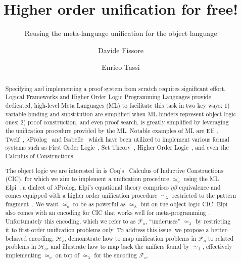 \documentclass[sigconf,natbib=false,review]{acmart}
\newcommand{\UnifRel}{\ensuremath{\simeq}}
\newcommand{\Uo}{\ensuremath{\UnifRel_o}\xspace}
\newcommand{\Ue}{\ensuremath{\UnifRel_\lambda}\xspace}
\newcommand{\Fo}{\ensuremath{\mathcal{F}_{\!o}\xspace}} %
\newcommand{\Ho}{\ensuremath{\mathcal{H}_o}\xspace}
\begin{document}
\title{Higher order unification for free!}
\subtitle{Reusing the meta-language unification for the object language}

\author{Davide Fissore}

\author{Enrico Tassi}

\begin{abstract}
  Specifying and implementing a proof system from scratch requires significant effort.
  Logical Frameworks and Higher Order Logic Programming Languages provide
  dedicated, high-level Meta Languages (ML) to facilitate this task in two
  key ways: 1) variable binding and substitution are simplified when ML binders
  represent object logic ones; 2) proof construction, and even proof search, is
  greatly simplified by leveraging the unification procedure provided by the ML.
  Notable examples of ML are Elf~\cite{elf}, Twelf~\cite{twelf},
  $\lambda$Prolog~\cite{miller_nadathur_2012} and
  Isabelle~\cite{10.1007/978-3-540-71067-7_7}
  which have been utilized to implement various formal systems such as
  First Order Logic~\cite{felty88cade},
  Set Theory~\cite{10.1007/BF00881873},
  Higher Order Logic~\cite{books/sp/NipkowPW02}, and even the Calculus of
  Constructions~\cite{felty93lics}.

  The object logic we are interested in is Coq's~\cite{Coq-refman}
  Calculus of Inductive Constructions (CIC),
  for which we aim to implement a unification procedure \Uo using the ML
  Elpi~\cite{dunchev15lpar}, a dialect of $\lambda$Prolog.
  Elpi's equational theory comprises
  $\eta\beta$ equivalence and comes equipped with a
  higher order unification procedure \Ue restricted to the pattern
  fragment~\cite{miller92jsc}.
  We want \Uo to be as powerful as \Ue but on the object logic CIC.
  Elpi also comes with an encoding for CIC that works well
  for meta-programming~\cite{tassi:hal-01637063,tassi:hal-01897468,gregoire:hal-03800154,newtc}.
  Unfortunately this encoding, which we refer to as \Fo,
  ``underuses'' \Ue by restricting it to first-order unification problems only.
  To address this issue, we propose a better-behaved encoding, \Ho,
  demonstrate how to map unification problems in \Fo{}
  to related problems in \Ho, and illustrate
  how to map back the unifiers found by \Ue, effectively implementing
   \Uo on top of \Ue for the encoding \Fo.

\end{abstract}
\end{document}
